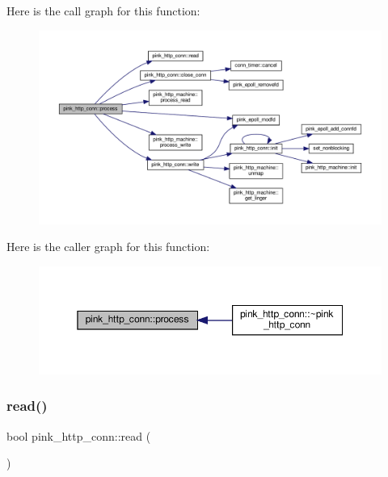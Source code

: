 Here is the call graph for this function\+:\nopagebreak
\begin{figure}[H]
\begin{center}
\leavevmode
\includegraphics[width=350pt]{classpink__http__conn_a41ca12d76d0056562633f27d456d0b62_cgraph}
\end{center}
\end{figure}
Here is the caller graph for this function\+:\nopagebreak
\begin{figure}[H]
\begin{center}
\leavevmode
\includegraphics[width=350pt]{classpink__http__conn_a41ca12d76d0056562633f27d456d0b62_icgraph}
\end{center}
\end{figure}
\mbox{\label{classpink__http__conn_a254c09e8b962e5a0bc116f8da271b5ed}} 
\subsubsection{\texorpdfstring{read()}{read()}}
{\footnotesize\ttfamily bool pink\+\_\+http\+\_\+conn\+::read (\begin{DoxyParamCaption}{ }\end{DoxyParamCaption})}



